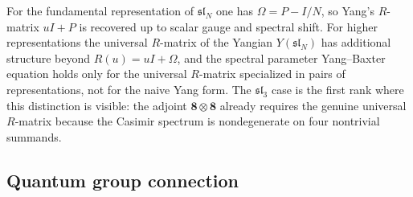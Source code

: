 \begin{remark}
\label{rem:sl3-yangian-fundamental-only}
For the fundamental representation of $\mathfrak{sl}_N$ one has
$\Omega = P - I/N$, so Yang's $R$-matrix \(uI+P\) is recovered up to
scalar gauge and spectral shift. For higher representations the universal $R$-matrix
of the Yangian $Y(\mathfrak{sl}_N)$ has additional structure beyond
$R(u) = uI + \Omega$, and the spectral parameter Yang--Baxter equation
holds only for the universal $R$-matrix specialized in pairs of
representations, not for the naive Yang form. The
$\mathfrak{sl}_3$ case is the first rank where this distinction is
visible: the adjoint $\mathbf{8}\otimes\mathbf{8}$ already requires
the genuine universal $R$-matrix because the Casimir spectrum is
nondegenerate on four nontrivial summands.
\end{remark}


\subsection{Quantum group connection}


